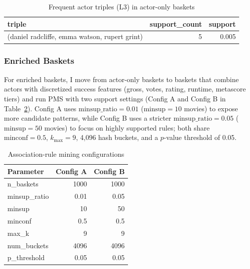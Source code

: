 \documentclass{article}  %
\begin{document}
\begin{table}[!htbp]

    \caption{Frequent actor triples (L3) in actor-only baskets}
    \centering
    \begin{tabular}{l r r}
        \toprule
        \textbf{triple} & \textbf{support\_count} & \textbf{support} \\
        \midrule
        (daniel radcliffe, emma watson, rupert grint) & 5 & 0.005 \\
        \bottomrule
    \end{tabular}
    \label{tab:21frequent_triples}
    
\end{table}

\subsubsection{Enriched Baskets}
For enriched baskets, I move from actor-only baskets to baskets that combine actors with discretized success features (gross, votes, rating, runtime, metascore tiers) and run PMS with two support settings (Config A and Config B in Table~\ref{tab:22config_comparison}). Config A uses \(\text{minsup\_ratio} = 0.01\) (\(\text{minsup} = 10\) movies) to expose more candidate patterns, while Config B uses a stricter \(\text{minsup\_ratio} = 0.05\) (\(\text{minsup} = 50\) movies) to focus on highly supported rules; both share \(\text{minconf} = 0.5\), \(k_{\max} = 9\), 4,096 hash buckets, and a \(p\)-value threshold of 0.05.

\begin{table}[!htbp]
    \caption{Association-rule mining configurations}
    \centering
    \begin{tabular}{l r r}
        \toprule
        \textbf{Parameter} & \textbf{Config A} & \textbf{Config B} \\
        \midrule
        n\_baskets   & 1000 & 1000 \\
        minsup\_ratio & 0.01 & 0.05 \\
        minsup       & 10   & 50   \\
        minconf      & 0.5  & 0.5  \\
        max\_k       & 9    & 9    \\
        num\_buckets & 4096 & 4096 \\
        p\_threshold & 0.05 & 0.05 \\
        \bottomrule
    \end{tabular}
    \label{tab:22config_comparison}
\end{table}
\end{document}
